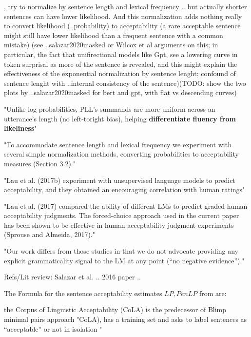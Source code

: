\citet{lau2020furiously}, try to normalize by sentence length and lexical frequency .. but actually shorter sentences can have lower likelihood. And this normalization adds nothing really to convert likelihood (..probability) to acceptability (a rare acceptable sentence might still have lower likelihood than a frequent sentence with a common mistake)
(see ..salazar2020masked or Wilcox et al arguments on this; in particular, the fact that unifirectional models like Gpt, see a lowering curve in token surprisal as more of the sentence is revealed, and this might explain the effectiveness of the exponential normalization by sentence lenght; confound of sentence lenght with ..internal consistency of the sentence)(TODO: show the two plots by ..salazar2020masked  for bert and gpt, with flat vs descending curves)

"Unlike log probabilities, PLL’s summands are more uniform across an utterance’s length (no left-toright bias), helping \textbf{differentiate fluency from likeliness}" \citep{salazar2020masked}


"To accommodate sentence length and lexical frequency we experiment with several simple normalization methods, converting probabilities
to acceptability measures (Section 3.2)." \citep{lau2020furiously}

"Lau et al. (2017b) experiment with unsupervised language models to predict acceptability, and they obtained an encouraging correlation with human ratings" \cite{lau2020furiously}

"Lau et al. (2017) compared the ability of different LMs to predict graded human acceptability judgments. The forced-choice approach used in the current paper has been shown to be effective in human
acceptability judgment experiments (Sprouse and Almeida, 2017)." \citep{marvin2018targeted}

"Our work differs from those studies in that we do not advocate providing any explicit grammaticality signal to the LM at any point (“no negative evidence”)." \citep{marvin2018targeted}

Refs/Lit review:
Salazar et al. ..
2016 paper
..

The Formula for the sentence acceptability estimates \( LP, PenLP \) from \citet{lau2020furiously} are:

the Corpus of Linguistic Acceptability (CoLA) is the predecessor of Blimp minimal pairs approach \citet{salazar2020masked}
"CoLA), has a training set and asks to label sentences as “acceptable” or not in isolation \citet{warstadt2019neural}"  \citet{salazar2020masked}




